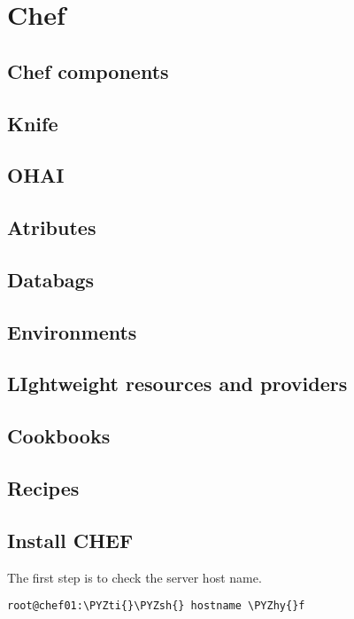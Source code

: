 \chapter{Chef}

\section{Chef components}

\section{Knife}

\section{OHAI}

\section{Atributes}

\section{Databags}

\section{Environments}

\section{LIghtweight resources and providers}

\section{Cookbooks}

\section{Recipes}

\section{Install CHEF}

The first step is to check the server host name.

\begin{codelisting}
\label{code:hostname}
\codecaption{}
\begin{Verbatim}[fontsize=\relsize{-2.5},fontseries=b,commandchars=\\\{\}]
root@chef01:\PYZti{}\PYZsh{} hostname \PYZhy{}f
\end{Verbatim}
\end{codelisting}

